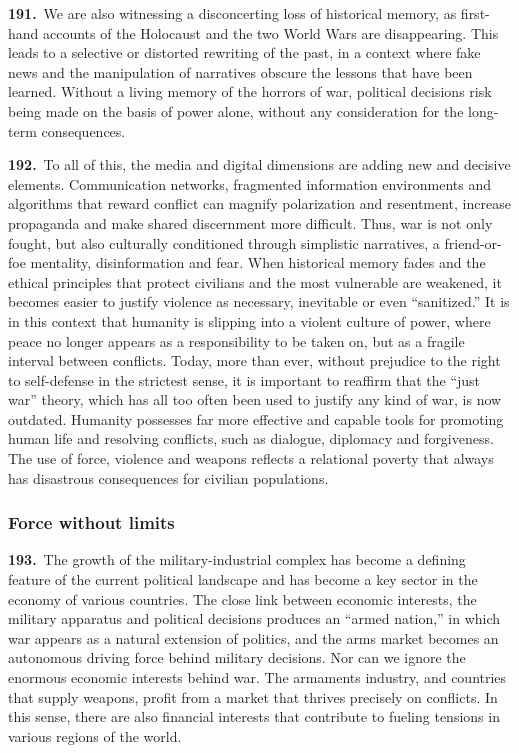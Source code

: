 \documentclass{article}
\begin{document}
\textbf{191.}\ We are also witnessing a disconcerting loss of historical memory, as first-hand accounts of the Holocaust and the two World Wars are disappearing. This leads to a selective or distorted rewriting of the past, in a context where fake news and the manipulation of narratives obscure the lessons that have been learned. Without a living memory of the horrors of war, political decisions risk being made on the basis of power alone, without any consideration for the long-term consequences.

\textbf{192.}\ To all of this, the media and digital dimensions are adding new and decisive elements. Communication networks, fragmented information environments and algorithms that reward conflict can magnify polarization and resentment, increase propaganda and make shared discernment more difficult. Thus, war is not only fought, but also culturally conditioned through simplistic narratives, a friend-or-foe mentality, disinformation and fear. When historical memory fades and the ethical principles that protect civilians and the most vulnerable are weakened, it becomes easier to justify violence as necessary, inevitable or even ``sanitized.'' It is in this context that humanity is slipping into a violent culture of power, where peace no longer appears as a responsibility to be taken on, but as a fragile interval between conflicts. Today, more than ever, without prejudice to the right to self-defense in the strictest sense, it is important to reaffirm that the ``just war'' theory, which has all too often been used to justify any kind of war, is now outdated.\cite{n182} Humanity possesses far more effective and capable tools for promoting human life and resolving conflicts, such as dialogue, diplomacy and forgiveness. The use of force, violence and weapons reflects a relational poverty that always has disastrous consequences for civilian populations.

\subsubsection{Force without limits}

\textbf{193.}\ The growth of the military-industrial complex has become a defining feature of the current political landscape and has become a key sector in the economy of various countries. The close link between economic interests, the military apparatus and political decisions produces an ``armed nation,'' in which war appears as a natural extension of politics, and the arms market becomes an autonomous driving force behind military decisions. Nor can we ignore the enormous economic interests behind war. The armaments industry, and countries that supply weapons, profit from a market that thrives precisely on conflicts. In this sense, there are also financial interests that contribute to fueling tensions in various regions of the world.
\end{document}
